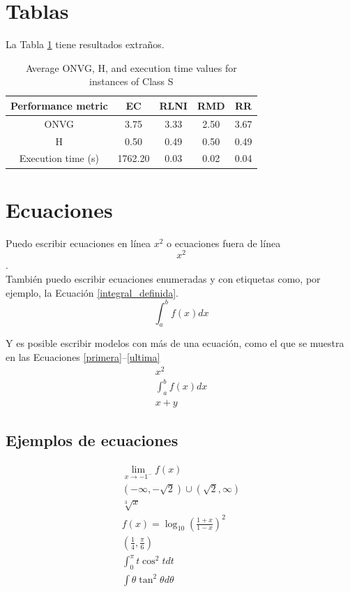 \documentclass[]{article}
\begin{document}
\section{Tablas}
La Tabla \ref{tabla_rara} tiene resultados extraños.

\begin{table}[H]\centering
	\begin{tabular}{ccccc}
		\toprule		
		Performance metric & EC & RLNI & RMD & RR \\ \midrule
		ONVG & 3.75 & 3.33 & 2.50 & 3.67 \\ 
		H & 0.50 & 0.49 & 0.50 & 0.49 \\ 
		Execution time (s) & 1762.20 & 0.03 & 0.02 & 0.04 \\ \bottomrule
	\end{tabular}
	\caption{Average ONVG, H, and execution time values for instances of Class S}
	\label{tabla_rara}
\end{table}

\section{Ecuaciones}
Puedo escribir ecuaciones en línea $x^2$ o ecuaciones fuera de línea $$x^2$$.\\

También puedo escribir ecuaciones enumeradas y con etiquetas como, por ejemplo, la Ecuación \eqref{integral_definida}.
\begin{equation}\label{integral_definida}
	\int_a^bf(x)dx
\end{equation}

Y es posible escribir modelos con más de una ecuación, como el que se muestra en las Ecuaciones \eqref{primera}--\eqref{ultima}
\begin{eqnarray}
	x^2 \label{primera} \\
	\int_a^bf(x)dx \label{segunda} \\
	x+y \label{ultima}
\end{eqnarray}

\subsection{Ejemplos de ecuaciones}
\begin{eqnarray*}
	\lim\limits_{x\rightarrow -1^{-}}f(x)\\
	(-\infty,-\sqrt{2})\cup (\sqrt{2},\infty)\\
	\sqrt[3]{x}\\
	f(x)=\log_{10}\left(\frac{1+x}{1-x}\right)^{2}\\
	\left(\frac{1}{4},\frac{\pi}{6}\right)\\
	\int_{0}^{\pi}t\cos^{2}tdt\\
	\int \theta \tan^{2}\theta d\theta 
\end{eqnarray*}
\end{document}
